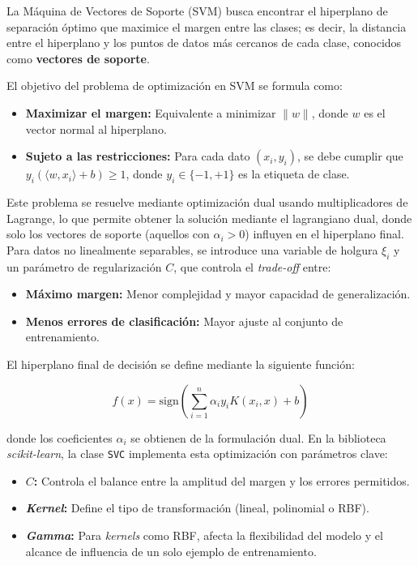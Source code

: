 La Máquina de Vectores de Soporte (SVM) busca encontrar el hiperplano de separación óptimo que maximice el margen entre las clases; es decir, la distancia entre el hiperplano y los puntos de datos más cercanos de cada clase, conocidos como \textbf{vectores de soporte}.

El objetivo del problema de optimización en SVM se formula como:

\begin{itemize}
    \item \textbf{Maximizar el margen:} Equivalente a minimizar $\|w\|$, donde $w$ es el vector normal al hiperplano.
    \item \textbf{Sujeto a las restricciones:} Para cada dato $(x_i, y_i)$, se debe cumplir que $y_i(\langle w, x_i \rangle + b) \geq 1$, donde $y_i \in \{-1, +1\}$ es la etiqueta de clase.
\end{itemize}

Este problema se resuelve mediante optimización dual usando multiplicadores de Lagrange, lo que permite obtener la solución mediante el lagrangiano dual, donde solo los vectores de soporte (aquellos con $\alpha_i > 0$) influyen en el hiperplano final. Para datos no linealmente separables, se introduce una variable de holgura $\xi_i$ y un parámetro de regularización $C$, que controla el \textit{trade-off} entre:

\begin{itemize}
    \item \textbf{Máximo margen:} Menor complejidad y mayor capacidad de generalización.
    \item \textbf{Menos errores de clasificación:} Mayor ajuste al conjunto de entrenamiento.
\end{itemize}

El hiperplano final de decisión se define mediante la siguiente función:

\begin{equation}
f(x) = \text{sign} \left( \sum_{i=1}^{n} \alpha_i y_i K(x_i, x) + b \right)
\end{equation}

\noindent donde los coeficientes $\alpha_i$ se obtienen de la formulación dual. En la biblioteca \textit{scikit-learn}, la clase \texttt{SVC} implementa esta optimización con parámetros clave:

\begin{itemize}
    \item \textbf{$C$:} Controla el balance entre la amplitud del margen y los errores permitidos.
    \item \textbf{\textit{Kernel}:} Define el tipo de transformación (lineal, polinomial o RBF).
    \item \textbf{\textit{Gamma}:} Para \textit{kernels} como RBF, afecta la flexibilidad del modelo y el alcance de influencia de un solo ejemplo de entrenamiento.
\end{itemize}

